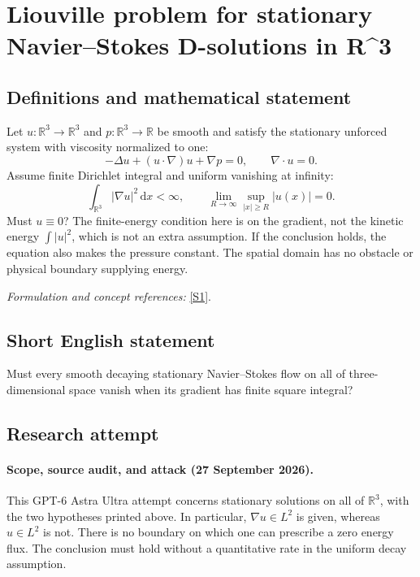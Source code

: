 \documentclass[11pt]{article}
\begin{document}
\section*{\texorpdfstring{Liouville problem for stationary Navier–Stokes D-solutions in R\textasciicircum{}3}{Liouville problem for stationary Navier–Stokes D-solutions in R\textasciicircum{}3}}\label{statement}
\subsection{Definitions and mathematical statement}
Let $u:{\mathbb{R}}^3\to{\mathbb{R}}^3$ and $p:{\mathbb{R}}^3\to{\mathbb{R}}$ be smooth and satisfy the stationary unforced system with viscosity normalized to one:
\[
 -\Delta u+(u\cdot\nabla)u+\nabla p=0,
 \qquad\nabla\cdot u=0.
\]
Assume finite Dirichlet integral and uniform vanishing at infinity:
\[
 \int_{{\mathbb{R}}^3}|\nabla u|^2{\,\mathrm{d}} x<\infty,
 \qquad \lim_{R\to\infty}\sup_{|x|\ge R}|u(x)|=0.
\]
Must $u\equiv0$? The finite-energy condition here is on the gradient, not the kinetic energy $\int|u|^2$, which is not an extra assumption. If the conclusion holds, the equation also makes the pressure constant. The spatial domain has no obstacle or physical boundary supplying energy.
\par\smallskip\textit{Formulation and concept references:} \href{https://arxiv.org/html/2506.14533v1}{[S1]}.

\subsection{Short English statement}
Must every smooth decaying stationary Navier--Stokes flow on all of three-dimensional space vanish when its gradient has finite square integral?
\subsection{Research attempt}

\paragraph{Scope, source audit, and attack (27 September 2026).}
This GPT-6 Astra Ultra attempt concerns stationary solutions on all of
$\mathbb R^3$, with the two hypotheses printed above. In particular,
$\nabla u\in L^2$ is given, whereas $u\in L^2$ is not. There is no
boundary on which one can prescribe a zero energy flux. The conclusion
must hold without a quantitative rate in the uniform decay assumption.
\end{document}
